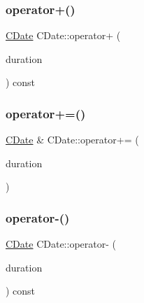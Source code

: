 \mbox{\label{class_c_date_ac45abf8f357a31af297a2602aecac529}} 
\subsubsection{\texorpdfstring{operator+()}{operator+()}}
{\footnotesize\ttfamily \mbox{\hyperlink{class_c_date}{C\+Date}} C\+Date\+::operator+ (\begin{DoxyParamCaption}\item[{const \mbox{\hyperlink{class_c_duration}{C\+Duration}} \&}]{duration }\end{DoxyParamCaption}) const}

\mbox{\label{class_c_date_ac56d08174348a544b5c56add4e2634d4}} 
\subsubsection{\texorpdfstring{operator+=()}{operator+=()}}
{\footnotesize\ttfamily \mbox{\hyperlink{class_c_date}{C\+Date}} \& C\+Date\+::operator+= (\begin{DoxyParamCaption}\item[{const \mbox{\hyperlink{class_c_duration}{C\+Duration}} \&}]{duration }\end{DoxyParamCaption})}

\mbox{\label{class_c_date_a7736d3c8fc1c10545ee0f0ce3397f260}} 
\subsubsection{\texorpdfstring{operator-\/()}{operator-()}\hspace{0.1cm}{\footnotesize\ttfamily [1/2]}}
{\footnotesize\ttfamily \mbox{\hyperlink{class_c_date}{C\+Date}} C\+Date\+::operator-\/ (\begin{DoxyParamCaption}\item[{const \mbox{\hyperlink{class_c_duration}{C\+Duration}} \&}]{duration }\end{DoxyParamCaption}) const}

\mbox{\label{class_c_date_aed1d924914698a4e64da455deb583656}} 
